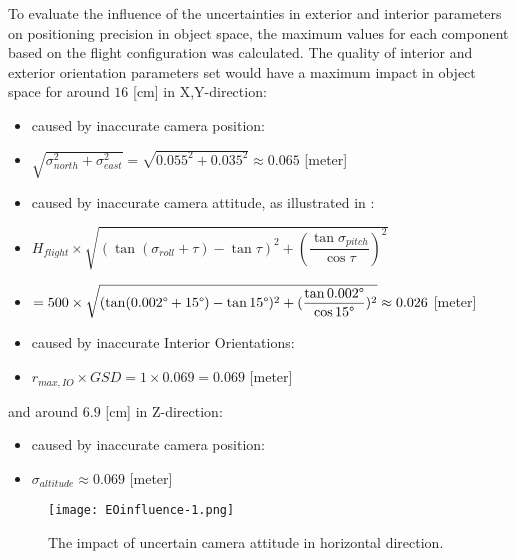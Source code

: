 \clearpage
To evaluate the influence of the uncertainties in exterior and interior parameters on positioning precision in object space, the maximum values for each component based on the flight configuration was calculated.
The quality of interior and exterior orientation parameters set would have a maximum impact in object space for around $16$ [cm] in X,Y-direction:
\begin{itemize}
      \item caused by inaccurate camera position: 
      \item [] $\sqrt{\sigma_{north}^2+\sigma_{east}^2}=\sqrt{0.055^2+0.035^2}\approx0.065$ [meter]
      \item caused by inaccurate camera attitude, as illustrated in :
      \item [] $ H_{flight}\times\sqrt{(\tan(\sigma_{roll}+\tau)-\tan\tau)^2+(\dfrac{\tan\sigma_{pitch}}{\cos\tau})^2}$
      \item [] $=500\times\sqrt{(\tan(0.002\degree+15\degree)-\tan15\degree)^2+(\dfrac{\tan0.002\degree}{\cos15\degree})^2}\approx0.026$ [meter]
      \item caused by inaccurate Interior Orientations:
      \item [] $r_{max, IO}\times GSD=1\times0.069=0.069$ [meter]
\end{itemize}
and around $6.9$ [cm] in Z-direction:
\begin{itemize}
      \item caused by inaccurate camera position:
      \item [] $\sigma_{altitude}\approx0.069$ [meter]
\end{itemize}

\begin{figure}%
	\centering
	\texttt{[image: EOinfluence-1.png]}
	\caption{\small The impact of uncertain camera attitude in horizontal direction.}
	\label{fig:EOinfluence-1}
\end{figure}

